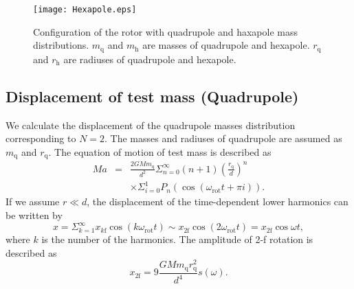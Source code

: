 \documentclass[%
 reprint,
superscriptaddress,
 amsmath,amssymb,
 aps,
]{revtex4-1}
\begin{document}
\begin{figure}
\begin{center}
\texttt{[image: Hexapole.eps]}
\caption{Configuration of the rotor with quadrupole and haxapole mass distributions. $m_{\mathrm{q}}$ and $m_{\mathrm{h}}$ are masses of quadrupole and hexapole. $r_{\mathrm{q}}$ and $r_{\mathrm{h}}$ are radiuses of quadrupole and hexapole.}
\label{fig:hex}
\end{center}
\end{figure}

\subsection{Displacement of test mass (Quadrupole)} \label{Quad}
We calculate the displacement of the quadrupole masses distribution corresponding to $N=2$.
The masses and radiuses of quadrupole are assumed as $m_{\mathrm{q}}$ and $r_{\mathrm{q}}$. 
The equation of motion of test mass is described as
\begin{eqnarray}
Ma&=&\frac{2GMm_{\mathrm{q}}}{d^2}\Sigma^{\infty}_{n=0}(n+1) \left( \frac{r_{\mathrm{q}}}{d} \right)^n \nonumber \\
&&\times \Sigma^1_{i=0}  P_n\left(\cos{\left(\omega_{\mathrm{rot}} t +\pi i \right)}\right).
\end{eqnarray} 
If we assume $r \ll d$, the displacement of the time-dependent lower harmonics can be written by 
\begin{equation}
x=\Sigma_{k=1}^{\infty}x_{k\mathrm{f}}\cos(k\omega_{\mathrm{rot}} t)\sim x_{\mathrm{2f}}\cos(2\omega_{\mathrm{rot}} t)=x_{\mathrm{2f}}\cos{\omega t},
\end{equation}
where $k$ is the number of the harmonics. 
The amplitude of 2-f rotation is described as
\begin{equation}
x_{2\mathrm{f}}=9\frac{GMm_{\mathrm{q}}r_{\mathrm{q}}^2}{d^4}s(\omega). \label{2f}
\end{equation}
\end{document}
